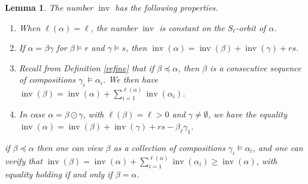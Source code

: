 \documentclass{article}
\newtheorem{lem}[thm]{Lemma}
\theoremstyle{definition}
\begin{document}
\begin{lem}
The number $\operatorname{inv}$ has the following properties.
\begin{enumerate}[$(i)$]
\item When $\ell(\alpha)=\ell$, the number $\operatorname{inv}$ is constant on the $S_{\ell}$-orbit of $\alpha$.
\item If $\alpha=\beta\gamma$ for $\beta \vDash r$ and $\gamma \vDash s$, then $\operatorname{inv}(\alpha)=\operatorname{inv}(\beta)+\operatorname{inv}(\gamma)+rs$.
\item Recall from Definition \ref{refine} that if $\beta\preceq\alpha$, then $\beta$ is a consecutive sequence of compositions $\gamma_{i}\vDash\alpha_{i}$. We then have $\operatorname{inv}(\beta)=\operatorname{inv}(\alpha)+\sum_{i=1}^{\ell(\alpha)}\operatorname{inv}(\alpha_{i})$.
\item In case $\alpha=\beta\odot\gamma$, with $\ell(\beta)=\ell>0$ and $\gamma\neq\emptyset$, we have the equality $\operatorname{inv}(\alpha)=\operatorname{inv}(\beta)+\operatorname{inv}(\gamma)+rs-\beta_{\ell}\gamma_{1}$.
\end{enumerate}
if $\beta\preceq\alpha$ then one can view $\beta$ as a collection of compositions $\gamma_{i}\vDash\alpha_{i}$, and one can verify that $\operatorname{inv}(\beta)=\operatorname{inv}(\alpha)+\sum_{i=1}^{\ell(\alpha)}\operatorname{inv}(\alpha_{i})\geq\operatorname{inv}(\alpha)$, with equality holding if and only if $\beta=\alpha$. \label{invprop}
\end{lem}
\end{document}
